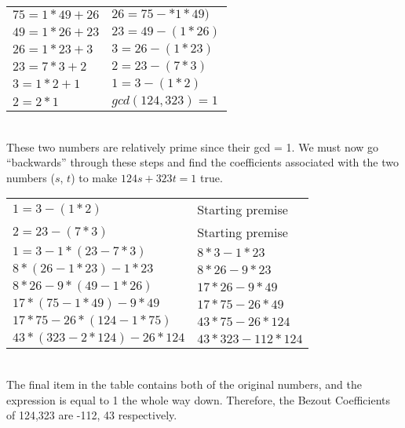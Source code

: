 \documentclass[11pt]{article}
\begin{document}
\begin{enumerate}
\begin{tabular}{ll}
			$75 = 1 * 49 + 26$ & $26 = 75 - *1*49)$\\

			$49 = 1 * 26 + 23$ & $23 = 49 - (1 * 26)$\\

			$26 = 1 * 23 + 3$ & $3 = 26 - (1 * 23)$\\

			$23 = 7 * 3 + 2$ & $2 = 23 - (7 * 3)$\\

			$3 = 1 * 2 + 1$ & $1 = 3 - (1 * 2)$\\

			$2 = 2 * 1$ & $gcd(124, 323) = 1$ \\

		\end{tabular} \\

		These two numbers are relatively prime since their gcd = 1. We must now go ``backwards''
		through these steps and find the coefficients associated with the two numbers ($s$, $t$)
		to make $124s + 323t = 1$ true.

		\begin{tabular}{ll}
			$1 = 3 - (1 * 2)$ & Starting premise\\

			$2 = 23 - (7 * 3)$ & Starting premise\\

			$1 = 3 - 1 * (23 - 7 * 3)$ & $8 * 3 - 1 * 23$ \\

			$8 * (26 - 1 * 23) - 1 * 23$ & $8 * 26 - 9 * 23$ \\

			$8 * 26 - 9 * (49 - 1 * 26)$ & $17 * 26 - 9 * 49$ \\

			$17 * (75 - 1 * 49) - 9 * 49$ & $17 * 75 - 26 * 49$ \\

			$17 * 75 - 26 * (124 - 1 * 75)$ & $43 * 75 - 26 * 124$ \\

			$43 * (323 - 2 * 124) - 26 * 124$ & $43 * 323 - 112 * 124$ \\

		\end{tabular}\\

		The final item in the table contains both of the original numbers,
		and the expression is equal to 1 the whole way down. Therefore, the Bezout
		Coefficients of 124,323 are -112, 43 respectively. \\


\end{enumerate}
\end{document}
